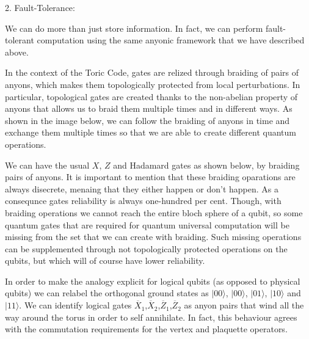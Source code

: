 \documentclass[12pt]{report}
\begin{document}
	\begin{minipage}{1 \textwidth}
		
		2. Fault-Tolerance: \newline
		
		We can do more than just store information. In fact, we can perform fault-tolerant computation using the same anyonic framework that we have described above. \newline
		
		In the context of the Toric Code, gates are relized through braiding of pairs of anyons, which makes them topologically protected from local perturbations. \newline
		In particular, topological gates are created thanks to the non-abelian property of anyons that allows us to braid them multiple times and in different ways.
		As shown in the image below, we can follow the braiding of anyons in time and exchange them multiple times so that we are able to create different quantum operations. \newline
		
		
		
		We can have the usual $X$, $Z$ and Hadamard gates as shown below, by braiding pairs of anyons. 
		It is important to mention that these braiding oparations are always disecrete, menaing that they either happen or don't happen. As a consequnce gates reliability is always one-hundred per cent. 
		Though, with braiding operations we cannot reach the entire bloch sphere of a qubit, so some quantum gates that are required for quantum universal computation will be missing from the set that we can create with braiding. Such missing operations can be supplemented through not topologically protected operations on the qubits, but which will of course have lower reliability. \newline
		
		In order to make the analogy explicit for logical qubits (as opposed to physical qubits) we can relabel the orthogonal ground states as $|00\rangle$, $|00\rangle$, $|01\rangle$, $|10\rangle$ and $|11\rangle$.
		We can identify logical gates $\overline{X}_1$,$\overline{X}_2$,$\overline{Z}_1$,$\overline{Z}_2$ as anyon pairs that wind all the way around the torus in order to self annihilate. 
		In fact, this behaviour agrees with the commutation requirements for the vertex and plaquette operators. 
		

\end{minipage}
\end{document}
